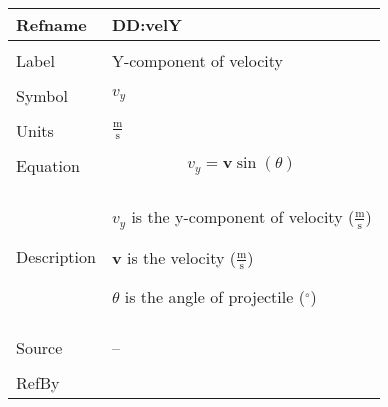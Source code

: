 \documentclass[12pt]{article}
\begin{document}
\noindent \begin{minipage}{\textwidth}
\begin{tabular}{p{} p{}}
\toprule \textbf{Refname} & \textbf{DD:velY}
\label{DD:velY}
\\ \midrule \\
Label & Y-component of velocity
\\ \midrule \\
Symbol & ${v_{y}}$
\\ \midrule \\
Units & $\frac{\text{m}}{\text{s}}$
\\ \midrule \\
Equation & \begin{displaymath}
           {v_{y}}=\mathbf{v} \sin\left(θ\right)
           \end{displaymath}
\\ \midrule \\
Description & \begin{symbDescription}
              \item{${v_{y}}$ is the y-component of velocity ($\frac{\text{m}}{\text{s}}$)}
              \item{$\mathbf{v}$ is the velocity ($\frac{\text{m}}{\text{s}}$)}
              \item{$θ$ is the angle of projectile (${}^{\circ}$)}
              \end{symbDescription}
\\ \midrule \\
Source & --
\\ \midrule \\
RefBy & 
\\ \bottomrule \end{tabular}
\end{minipage}
\end{document}
